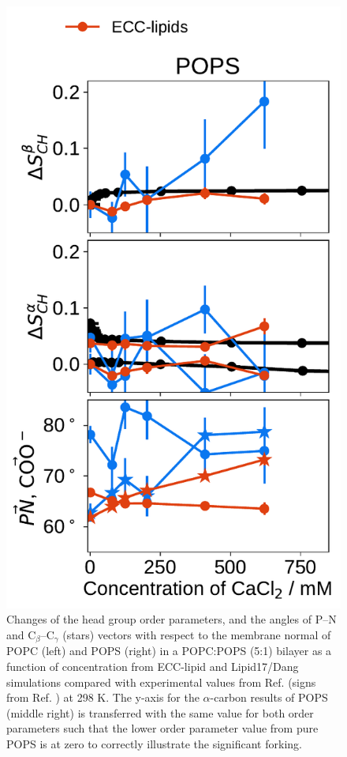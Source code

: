 \documentclass[journal=jpcbfk,manuscript=article]{achemso}
\newlength{\figheight}
\begin{document}
\begin{figure}[tbp!]
  \includegraphics[height=\figheight]{../img/ecc_pops/order_parameters_changes_ecc-lip_L14_A-B-PN-COO_POPS_cacl.pdf} 
  \caption{\label{fig:delta_ordPar_CaCl_PCPS} 
    Changes of the head group order parameters, and the angles of P--N and C$_\beta$--C$_\gamma$ (stars) vectors 
    with respect to the membrane normal of POPC (left) and POPS (right) in a POPC:POPS (5:1) bilayer 
    as a function of  concentration from ECC-lipid and Lipid17/Dang simulations 
    compared with experimental values from Ref.  (signs from Ref. ) at 298 K.
    The y-axis for the $\alpha$-carbon results of POPS (middle right) is transferred
    with the same value for both order parameters such that the lower order
    parameter value from pure POPS is at zero to correctly illustrate the significant forking.
  }
\end{figure} 
\end{document}
